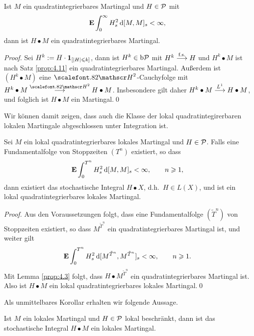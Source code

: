 \begin{lemma}
\label{lem:4.3}
Ist $M$ ein quadratintegrierbares Martingal und $H \in \mathcal{P}$ mit
\begin{align*}
\mathbf{E}\int_0^\infty H^2_s \, \mathrm{d}[M,M]_s < \infty, 
\end{align*}
dann ist $H \bullet M$ ein quadratintegrierbares Martingal.\fish
\end{lemma}
\begin{proof}
Sei $H^k := H\cdot \mathbf{1}_{[\lvert H\rvert\leqslant k]}$, dann ist $H^k\in\mathrm{b}\mathcal{P}$ mit $H^k\overset{\text{f.s.}}{\longrightarrow}
H$ und $H^k\bullet M$ ist nach Satz \ref{prop:4.11} ein quadratintegrierbares
Martingal. Außerdem ist $(H^k\bullet M)$ eine $\HH^2$-Cauchyfolge mit
$H^k\bullet M\Hto H\bullet M$. Insbesondere gilt daher $H^k\bullet M\overset{L^1}{\longrightarrow}
H\bullet M$, und folglich ist $H\bullet M$ ein Martingal.\qed
\end{proof}

Wir können damit zeigen, dass auch die Klasse der lokal quadratintegirerbaren
lokalen Martingale abgeschlossen unter Integration ist.

\begin{theorem}
\label{prop:4.23}
Sei $M$ ein lokal quadratintegrierbares lokales Martingal und $H \in \mathcal{P}$.
Falls eine Fundamentalfolge von Stoppzeiten $(T^n)$ existiert, so dass 
\begin{align*}
\mathbf{E}\int_0^{T^n} H^2_s \, \mathrm{d}[M,M]_s < \infty,\qquad n\geqslant 1,
\end{align*}
dann existiert das stochastische Integral $H \bullet X$, d.h.\ $H\in L(X)$, und
ist ein lokal quadratintegrierbares lokales Martingal.\fish
\end{theorem}
\begin{proof}
Aus den Voraussetzungen folgt, dass eine Fundamentalfolge $(\tilde T^n)$ von
Stoppzeiten existiert, so dass $M^{\tilde T^n}$ ein quadratintegrierbares
Martingal ist, und weiter gilt
\begin{align*}
\mathbf{E}\int_0^{T^n} H^2_s \, \mathrm{d}[M^{\tilde T^n},M^{\tilde T^n}]_s < \infty,\qquad
n\geqslant 1.
\end{align*}
Mit Lemma \ref{prop:4.3} folgt, dass $H\bullet M^{\tilde T^n}$ ein
quadratintegrierbares Martingal ist. Also ist $H\bullet M$ ein lokal
quadratintegrierbares lokales Martingal.\qed
\end{proof}

Als unmittelbares Korollar erhalten wir folgende Aussage.

\begin{theorem}
Ist $M$ ein lokales Martingal und $H \in \mathcal{P}$ lokal beschränkt, dann ist das
stochastische Integral $H \bullet M$ ein lokales Martingal.
\end{theorem}

